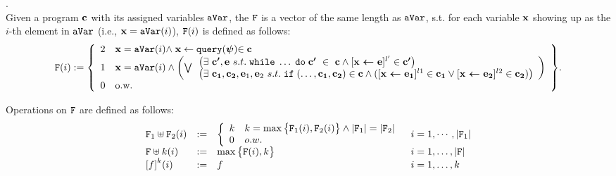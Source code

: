\documentclass[a4paper,11pt]{article}
\begin{document}
\begin{defn}.
\\
Given a program  $\boldsymbol{\mathbf{c}}$ with its assigned variables $\mathtt{aVar}$, the $\mathtt{F}$ is a vector of the same length as $\mathtt{aVar}$, s.t. for each variable $\boldsymbol{\mathbf{x}}$ showing up as the $i$-th element in $\mathtt{aVar}$ (i.e., $\boldsymbol{\mathbf{x}} = \mathtt{aVar}(i)$), $\mathtt{F}(i)$ is defined as follows:
%
%
\[
	\flag(i) := 
	\left\{
	\begin{array}{ll}
	2 & \ssa{x} = \avar(i) \land 
	\assign{\ssa{x}}{\query(\ssa{\qexpr})} \in \ssa{c}
	\\
	1 & \ssa{x} = \avar(i) \land 
	\left(
	\bigvee
	\begin{array}{l}
	\big(\exists  ~ \ssa{c'}, \ssa{\expr} ~ s.t.
		\ewhile \ldots \edo \ssa{c'} ~ \in ~\ssa{c}
		\land 
		[\ssa{\assign{x}{\expr}}]^{l'} \in \ssa{c'}
	\big)
	\\
	\big(\exists ~  \ssa{c_1}, \ssa{c_2}, \ssa{\expr}_1, \ssa{\expr}_2 ~ s.t.
		\eif(\ldots, \ssa{c_1}, \ssa{c_2}) \in \ssa{c} \land
		([\ssa{\assign{x}{\expr_1}}]^{l1} \in \ssa{c_1} \lor 
		[\ssa{\assign{x}{\expr_2}}]^{l2} \in \ssa{c_2})
	\big)
	\end{array}
	\right)
	\\
	0 & \text{o.w.}
	\end{array}
	\right\}. 
\] 
\end{defn}
%
Operations on $\mathtt{F}$ are defined as follows:
\begin{equation}
\begin{array}{llll}
{\flag_1 \uplus \flag_2}(i) & := &
\left\{
\begin{array}{ll}
k & k = \max{\big\{\flag_1(i), \flag_2(i)\big\}} 
	\land |\flag_1| = |\flag_2|\\
0 & o.w.
\end{array}\right.
& i = 1, \cdots, |\flag_1|  
\\
{\flag \uplus k}(i) & := & 
\max\big\{ \flag(i), k \big\} 
& i = 1, \ldots, |\flag|    
\\
\left[ f \right]^k (i) & := &  f 
& i = 1, \ldots, k 
\end{array}
\end{equation}
\end{document}
